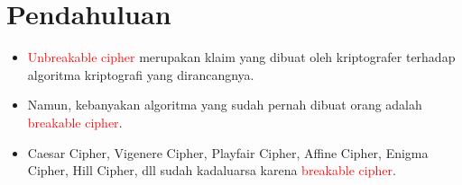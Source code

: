 \documentclass{article}
\begin{document}

\section*{Pendahuluan}

\begin{itemize}
    \item \textcolor{red}{Unbreakable cipher} merupakan klaim yang dibuat oleh kriptografer terhadap algoritma kriptografi yang dirancangnya.
    \item Namun, kebanyakan algoritma yang sudah pernah dibuat orang adalah \textcolor{red}{breakable cipher}.
    \item Caesar Cipher, Vigenere Cipher, Playfair Cipher, Affine Cipher, Enigma Cipher, Hill Cipher, dll sudah kadaluarsa karena \textcolor{red}{breakable cipher}.
\end{itemize}
\end{document}
